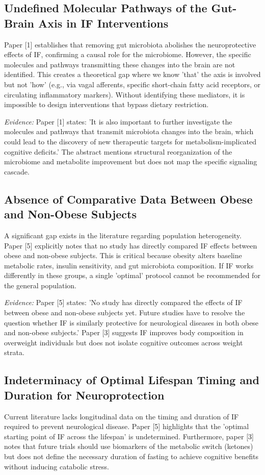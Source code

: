 \documentclass[11pt]{article}
\begin{document}
\subsection{Undefined Molecular Pathways of the Gut-Brain Axis in IF Interventions}
Paper [1] establishes that removing gut microbiota abolishes the neuroprotective effects of IF, confirming a causal role for the microbiome. However, the specific molecules and pathways transmitting these changes into the brain are not identified. This creates a theoretical gap where we know 'that' the axis is involved but not 'how' (e.g., via vagal afferents, specific short-chain fatty acid receptors, or circulating inflammatory markers). Without identifying these mediators, it is impossible to design interventions that bypass dietary restriction.

\textit{Evidence:} Paper [1] states: 'It is also important to further investigate the molecules and pathways that transmit microbiota changes into the brain, which could lead to the discovery of new therapeutic targets for metabolism-implicated cognitive deficits.' The abstract mentions structural reorganization of the microbiome and metabolite improvement but does not map the specific signaling cascade.

\subsection{Absence of Comparative Data Between Obese and Non-Obese Subjects}
A significant gap exists in the literature regarding population heterogeneity. Paper [5] explicitly notes that no study has directly compared IF effects between obese and non-obese subjects. This is critical because obesity alters baseline metabolic rates, insulin sensitivity, and gut microbiota composition. If IF works differently in these groups, a single 'optimal' protocol cannot be recommended for the general population.

\textit{Evidence:} Paper [5] states: 'No study has directly compared the effects of IF between obese and non-obese subjects yet. Future studies have to resolve the question whether IF is similarly protective for neurological diseases in both obese and non-obese subjects.' Paper [3] suggests IF improves body composition in overweight individuals but does not isolate cognitive outcomes across weight strata.

\subsection{Indeterminacy of Optimal Lifespan Timing and Duration for Neuroprotection}
Current literature lacks longitudinal data on the timing and duration of IF required to prevent neurological disease. Paper [5] highlights that the 'optimal starting point of IF across the lifespan' is undetermined. Furthermore, paper [3] notes that future trials should use biomarkers of the metabolic switch (ketones) but does not define the necessary duration of fasting to achieve cognitive benefits without inducing catabolic stress.
\end{document}
